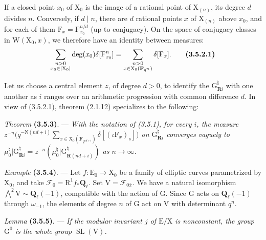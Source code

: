 \documentclass[11pt,leqno]{article}
\begin{document}
If a closed point \(x_0\) of \(\mathrm X_0\) is the image of a rational point of \(\mathrm X_{(n)}\), its degree \(d\) divides \(n\). Conversely, if \(d\mid n\), there are \(d\) rational points \(x\) of \(\mathrm X_{(n)}\) above \(x_0\), and for each of them \(\mathrm F_x=\mathrm F_{x_0}^{n/d}\) (up to conjugacy). On the space of conjugacy classes in \(\mathrm W(\mathrm X_0,x)\), we therefore have an identity between measures:
\[
\sum_{\substack{n>0\\x_0\in|\mathrm X_0|}}
\deg(x_0)\delta[\mathrm F_{x_0}^{n}]
=
\sum_{\substack{n>0\\x\in\mathrm X_0(\mathbf F_{q^n})}}
\delta[\mathrm F_x].
\tag*{\textbf{(3.5.2.1)}}
\]

Let us choose a central element \(z\), of degree \(d>0\), to identify the \(\mathrm G_{\mathbf R i}^{\natural}\) with one another as \(i\) ranges over an arithmetic progression with common difference \(d\). In view of (3.5.2.1), theorem (2.1.12) specializes to the following:

\textit{Theorem} \textbf{(3.5.3)}. — \textit{With the notation of (3.5.1), for every \(i\), the measure \(\displaystyle z^{-n}\bigl(q^{-\mathrm N(nd+i)}\sum_{x\in\mathrm X_0(\mathbf F_{q^{nd+i}})}\delta[(\iota\mathrm F_x)_s]\bigr)\) on \(\mathrm G_{\mathbf R i}^{\natural}\) converges vaguely to \(\mu_0^{\natural}\vert\mathrm G_{\mathbf R i}^{\natural}=z^{-n}(\mu_0^{\natural}\vert\mathrm G_{\mathbf R(nd+i)}^{\natural})\) as \(n\to\infty\).}

\textit{Example} \textbf{(3.5.4)}. — Let \(f:\mathrm E_0\to\mathrm X_0\) be a family of elliptic curves parametrized by \(\mathrm X_0\), and take \(\mathscr F_0=\mathrm R^1f_*\mathbf Q_\ell\). Set \(\mathrm V=\mathscr F_{0\bar x}\). We have a natural isomorphism \(\bigwedge\limits^{2}\mathrm V\sim\mathbf Q_\ell(-1)\), compatible with the action of \(\mathrm G\). Since \(\mathrm G\) acts on \(\mathbf Q_\ell(-1)\) through \(\omega_{-1}\), the elements of degree \(n\) of \(\mathrm G\) act on \(\mathrm V\) with determinant \(q^n\).

\textit{Lemma} \textbf{(3.5.5)}. — \textit{If the modular invariant \(j\) of \(\mathrm E/\mathrm X\) is nonconstant, the group \(\mathrm G^0\) is the whole group \(\operatorname{SL}(\mathrm V)\).}
\end{document}
